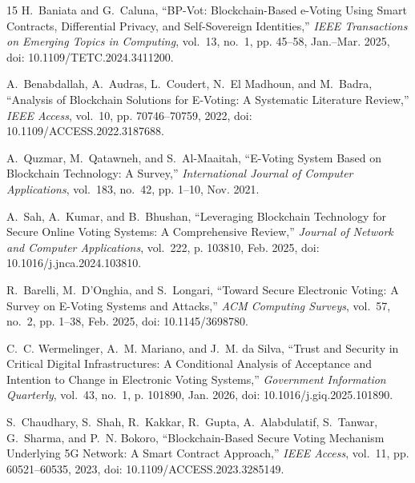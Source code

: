 \documentclass[12pt,a4paper]{report}
\begin{document}
\begin{thebibliography}{15}
H.~Baniata and G.~Caluna, ``BP-Vot: Blockchain-Based e-Voting Using Smart Contracts, Differential Privacy, and Self-Sovereign Identities,'' \emph{IEEE Transactions on Emerging Topics in Computing}, vol.~13, no.~1, pp. 45--58, Jan.--Mar. 2025, doi: 10.1109/TETC.2024.3411200.

A.~Benabdallah, A.~Audras, L.~Coudert, N.~El Madhoun, and M.~Badra, ``Analysis of Blockchain Solutions for E-Voting: A Systematic Literature Review,'' \emph{IEEE Access}, vol.~10, pp. 70746--70759, 2022, doi: 10.1109/ACCESS.2022.3187688.

A.~Quzmar, M.~Qatawneh, and S.~Al-Maaitah, ``E-Voting System Based on Blockchain Technology: A Survey,'' \emph{International Journal of Computer Applications}, vol.~183, no.~42, pp. 1--10, Nov. 2021.

A.~Sah, A.~Kumar, and B.~Bhushan, ``Leveraging Blockchain Technology for Secure Online Voting Systems: A Comprehensive Review,'' \emph{Journal of Network and Computer Applications}, vol.~222, p. 103810, Feb. 2025, doi: 10.1016/j.jnca.2024.103810.

R.~Barelli, M.~D'Onghia, and S.~Longari, ``Toward Secure Electronic Voting: A Survey on E-Voting Systems and Attacks,'' \emph{ACM Computing Surveys}, vol.~57, no.~2, pp. 1--38, Feb. 2025, doi: 10.1145/3698780.

C.~C. Wermelinger, A.~M. Mariano, and J.~M. da Silva, ``Trust and Security in Critical Digital Infrastructures: A Conditional Analysis of Acceptance and Intention to Change in Electronic Voting Systems,'' \emph{Government Information Quarterly}, vol.~43, no.~1, p. 101890, Jan. 2026, doi: 10.1016/j.giq.2025.101890.

S.~Chaudhary, S.~Shah, R.~Kakkar, R.~Gupta, A.~Alabdulatif, S.~Tanwar, G.~Sharma, and P.~N. Bokoro, ``Blockchain-Based Secure Voting Mechanism Underlying 5G Network: A Smart Contract Approach,'' \emph{IEEE Access}, vol.~11, pp. 60521--60535, 2023, doi: 10.1109/ACCESS.2023.3285149.

\end{thebibliography}
\end{document}
